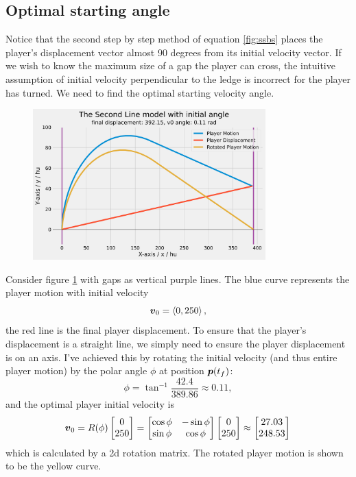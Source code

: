 
\subsection{Optimal starting angle}
Notice that the second step by step method of equation \ref{fig:ssbs} places the player's displacement vector almost 90 degrees from its initial velocity vector. If we wish to know the maximum size of a gap the player can cross, the intuitive assumption of initial velocity perpendicular to the ledge is incorrect for the player has turned. We need to find the optimal starting velocity angle.


\begin{figure}[H]
    \centering
    \includegraphics[width=0.8\textwidth]{assets/step_by_step_edge.png}
    \caption{}
    \label{fig:sbsedge}
\end{figure}


Consider figure \ref{fig:sbsedge} with gaps as vertical purple lines. The blue curve represents the player motion with initial velocity
\[
    \boldsymbol{v}_0 = \left\langle 0, 250 \right\rangle,
\]
the red line is the final player displacement. To ensure that the player's displacement is a straight line, we simply need to ensure the player displacement is on an axis. I've achieved this by rotating the initial velocity (and thus entire player motion) by the polar angle $\phi$ at position $\boldsymbol{p}({t_f})$:
\[
    \phi = \tan^{-1} \frac{42.4}{389.86} \approx 0.11,
\]
and the optimal player initial velocity is
\[
    \boldsymbol{v}_0 = R(\phi)\begin{bmatrix}0\\250 \end{bmatrix} = \begin{bmatrix}
        \cos \phi & -\sin \phi \\
        \sin \phi & \cos \phi
    \end{bmatrix}\begin{bmatrix}0\\250 \end{bmatrix} \approx \begin{bmatrix}27.03\\248.53 \end{bmatrix}
\]
which is calculated by a 2d rotation matrix. The rotated player motion is shown to be the yellow curve.

